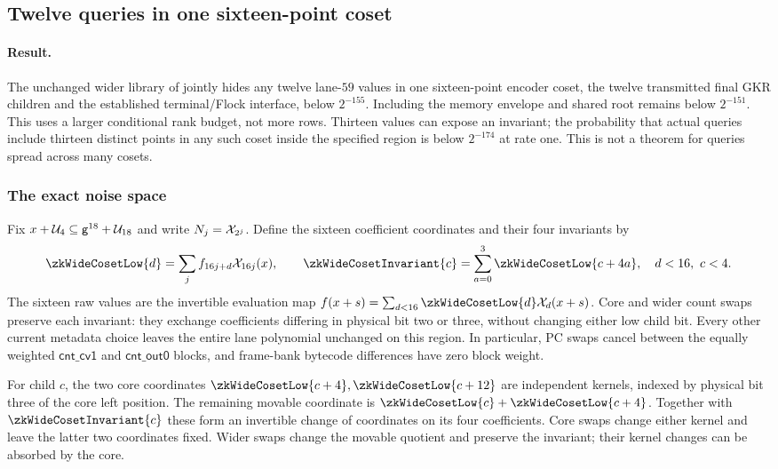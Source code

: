 \subsection{Twelve queries in one sixteen-point coset}\label{note:zk-flock-sixteen}

\paragraph{Result.} The unchanged wider library of  jointly hides any twelve lane-$59$ values in one sixteen-point encoder coset, the twelve transmitted final GKR children and the established terminal/Flock interface, below $2^{-155}$. Including the memory envelope and shared root remains below $2^{-151}$. This uses a larger conditional rank budget, not more rows. Thirteen values can expose an invariant; the probability that actual queries include thirteen distinct points in any such coset inside the specified region is below $2^{-174}$ at rate one. This is not a theorem for queries spread across many cosets.

\subsubsection{The exact noise space}

Fix $x+\mathcal{U}_4\subseteq\mathsf{g}^{18}+\mathcal{U}_{18}$ and write $N_j=\mathcal{X}_{2^j}$. Define the sixteen coefficient coordinates and their four invariants by
\[
 \zkWideCosetLow{d}=\sum_j f_{16j+d}\novel_{16j}(x),\qquad
 \zkWideCosetInvariant{c}=\sum_{a=0}^3\zkWideCosetLow{c+4a},
 \quad d<16,\ c<4.
\]
The sixteen raw values are the invertible evaluation map $f(x+s)=\sum_{d<16}\zkWideCosetLow{d}\novel_d(x+s)$. Core and wider count swaps preserve each invariant: they exchange coefficients differing in physical bit two or three, without changing either low child bit. Every other current metadata choice leaves the entire lane polynomial unchanged on this region. In particular, PC swaps cancel between the equally weighted $\mathsf{cnt\_cv1}$ and $\mathsf{cnt\_out0}$ blocks, and frame-bank bytecode differences have zero block weight.

For child $c$, the two core coordinates $\zkWideCosetLow{c+4},\zkWideCosetLow{c+12}$ are independent kernels, indexed by physical bit three of the core left position. The remaining movable coordinate is $\zkWideCosetLow{c}+\zkWideCosetLow{c+4}$. Together with $\zkWideCosetInvariant{c}$ these form an invertible change of coordinates on its four coefficients. Core swaps change either kernel and leave the latter two coordinates fixed. Wider swaps change the movable quotient and preserve the invariant; their kernel changes can be absorbed by the core.

